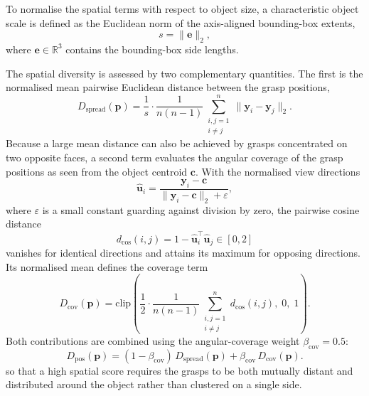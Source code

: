 \begin{enumerate}
To normalise the spatial terms with respect to object size, a characteristic object scale
is defined as the Euclidean norm of the axis-aligned bounding-box extents,
\begin{equation}
    s = \|\mathbf{e}\|_2 ,
\end{equation}
where $\mathbf{e} \in \mathbb{R}^3$ contains the bounding-box side lengths.

The spatial diversity is assessed by two complementary quantities. The first is the
normalised mean pairwise Euclidean distance between the grasp positions,
\begin{equation}
    D_{\mathrm{spread}}(\mathbf{p}) =
    \frac{1}{s} \cdot
    \frac{1}{n(n-1)}
    \sum_{\substack{i,j=1 \\ i \neq j}}^{n}
    \|\mathbf{y}_i - \mathbf{y}_j\|_2 .
\end{equation}
Because a large mean distance can also be achieved by grasps concentrated on two opposite
faces, a second term evaluates the angular coverage of the grasp positions as seen from
the object centroid $\mathbf{c}$. With the normalised view directions
\begin{equation}
    \hat{\mathbf{u}}_i =
    \frac{\mathbf{y}_i - \mathbf{c}}{\|\mathbf{y}_i - \mathbf{c}\|_2 + \varepsilon},
\end{equation}
where $\varepsilon$ is a small constant guarding against division by zero, the pairwise
cosine distance
\begin{equation}
    d_{\cos}(i,j) = 1 - \hat{\mathbf{u}}_i^\top \hat{\mathbf{u}}_j \in [0,2]
\end{equation}
vanishes for identical directions and attains its maximum for opposing directions. Its
normalised mean defines the coverage term
\begin{equation}
    D_{\mathrm{cov}}(\mathbf{p}) =
    \mathrm{clip}\!\left(
        \frac{1}{2} \cdot
        \frac{1}{n(n-1)}
        \sum_{\substack{i,j=1 \\ i \neq j}}^{n}
        d_{\cos}(i,j),
        \; 0, \; 1
    \right).
\end{equation}
Both contributions are combined using the angular-coverage weight
$\beta_{\mathrm{cov}} = 0.5$:
\begin{equation}
    D_{\mathrm{pos}}(\mathbf{p}) =
    (1-\beta_{\mathrm{cov}})\,D_{\mathrm{spread}}(\mathbf{p})
    +
    \beta_{\mathrm{cov}}\,D_{\mathrm{cov}}(\mathbf{p}).
\end{equation}
so that a high spatial score requires the grasps to be both mutually distant and
distributed around the object rather than clustered on a single side.


\end{enumerate}
